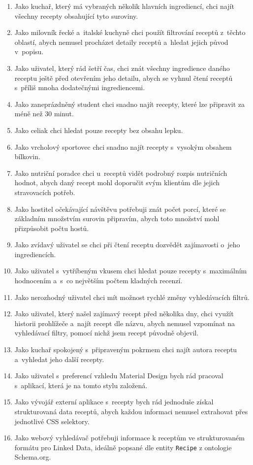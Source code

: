 \begin{enumerate}
    \item Jako kuchař, který má vybraných několik hlavních ingrediencí, chci najít všechny recepty obsahující tyto suroviny.
    \item Jako milovník řecké a~italské kuchyně chci použít filtrování receptů z~těchto oblastí, abych nemusel procházet detaily receptů a~hledat jejich původ v~popisu.
    \item Jako uživatel, který rád šetří čas, chci znát všechny ingredience daného receptu ještě před otevřením jeho detailu, abych se vyhnul čtení receptů s~příliš mnoha dodatečnými ingrediencemi.
    \item Jako zaneprázdněný student chci snadno najít recepty, které lze připravit za méně než $30$ minut.
    \item Jako celiak chci hledat pouze recepty bez obsahu lepku.
    \item Jako vrcholový sportovec chci snadno najít recepty s~vysokým obsahem bílkovin.
    \item Jako nutriční poradce chci u~receptů vidět podrobný rozpis nutričních hodnot, abych daný recept mohl doporučit svým klientům dle jejich stravovacích potřeb.
    \item Jako hostitel očekávající návštěvu potřebuji znát počet porcí, které se základním množstvím surovin připravím, abych toto množství mohl přizpůsobit počtu hostů.
    \item Jako zvídavý uživatel se chci při čtení receptu dozvědět zajímavosti o~jeho ingrediencích.
    \item Jako uživatel s~vytříbeným vkusem chci hledat pouze recepty s~maximálním hodnocením a~s~co největším počtem kladných recenzí.
    \item Jako nerozhodný uživatel chci mít možnost rychlé změny vyhledávacích filtrů.
    \item Jako uživatel, který našel zajímavý recept před několika dny, chci využít historii prohlížeče a~najít recept dle názvu, abych nemusel vzpomínat na vyhledávací filtry, pomocí nichž jsem recept původně objevil.
    \item Jako kuchař spokojený s~připraveným pokrmem chci najít autora receptu a~vyhledat jeho další recepty.
    \item Jako uživatel s~preferencí vzhledu Material Design bych rád pracoval s~aplikací, která je na tomto stylu založená.
    \item Jako vývojář externí aplikace s~recepty bych rád jednoduše získal strukturovaná data receptů, abych každou informaci nemusel extrahovat přes jednotlivé CSS selektory.
    \item Jako webový vyhledávač potřebuji informace k receptům ve strukturovaném formátu pro Linked Data, ideálně popsané dle entity \texttt{Recipe} z ontologie Schema.org.
\end{enumerate}

